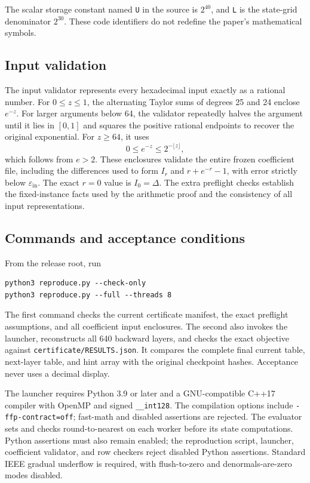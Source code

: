 The scalar storage constant named \texttt{U} in the source is $2^{40}$,
and \texttt{L} is the state-grid denominator $2^{30}$. These code
identifiers do not redefine the paper's mathematical symbols.

\subsection{Input validation}
The input validator represents every hexadecimal input exactly
as a rational number. For $0\le z\le1$, the alternating Taylor sums of
degrees 25 and 24 enclose $e^{-z}$. For larger arguments below 64,
the validator repeatedly halves the argument until it lies in $[0,1]$
and squares the positive rational endpoints to recover the original
exponential. For $z\ge64$, it uses
\[
 0\le e^{-z}\le 2^{-\lfloor z\rfloor},
\]
which follows from $e>2$. These enclosures validate the entire frozen
coefficient file, including the differences used to form $I_r$ and
$r+e^{-r}-1$, with error strictly below
$\varepsilon_{\mathrm{in}}$. The exact $r=0$ value is $I_0=\Delta$.
The extra preflight checks establish the fixed-instance facts used by
the arithmetic proof and the consistency of all input representations.

\subsection{Commands and acceptance conditions}
From the release root, run
\begin{verbatim}
python3 reproduce.py --check-only
python3 reproduce.py --full --threads 8
\end{verbatim}
The first command checks the current certificate manifest, the exact preflight
assumptions, and all coefficient input enclosures. The second also invokes
the launcher, reconstructs all 640 backward layers, and checks
the exact objective against \texttt{certificate/RESULTS.json}. It compares
the complete final current table, next-layer table, and hint array with
the original checkpoint hashes. Acceptance never uses a decimal display.

The launcher requires Python 3.9 or later and a GNU-compatible C++17
compiler with OpenMP and signed \texttt{\_\_int128}. The compilation
options include \texttt{-ffp-contract=off}; fast-math and disabled
assertions are rejected. The evaluator sets and checks round-to-nearest
on each worker before its state computations. Python assertions must
also remain enabled; the reproduction script, launcher, coefficient
validator, and row checkers reject disabled Python assertions. Standard IEEE gradual underflow is required, with flush-to-zero
and denormals-are-zero modes disabled.

